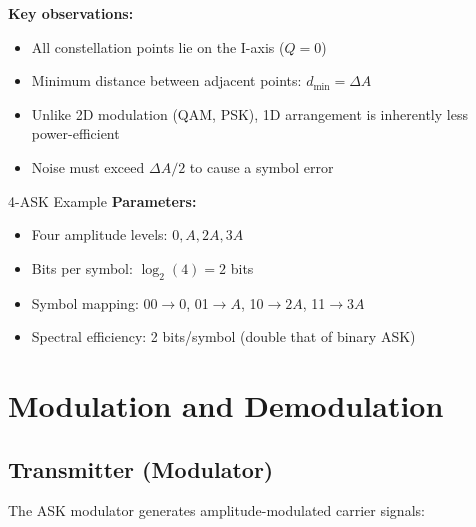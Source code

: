 \textbf{Key observations:}
\begin{itemize}
\item All constellation points lie on the I-axis ($Q = 0$)
\item Minimum distance between adjacent points: $d_{\min} = \Delta A$
\item Unlike 2D modulation (QAM, PSK), 1D arrangement is inherently less power-efficient
\item Noise must exceed $\Delta A/2$ to cause a symbol error
\end{itemize}

\begin{calloutbox}[colback=black!5!white,colframe=black]{4-ASK Example}
\textbf{Parameters:}
\begin{itemize}
\item Four amplitude levels: $0, A, 2A, 3A$
\item Bits per symbol: $\log_2(4) = 2$ bits
\item Symbol mapping: 00$\rightarrow$0, 01$\rightarrow A$, 10$\rightarrow 2A$, 11$\rightarrow 3A$
\item Spectral efficiency: 2 bits/symbol (double that of binary ASK)
\end{itemize}
\end{calloutbox}

\section{Modulation and Demodulation}

\subsection{Transmitter (Modulator)}

The ASK modulator generates amplitude-modulated carrier signals:

